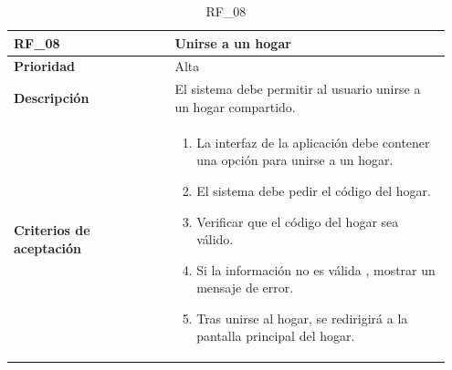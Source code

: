 \begin{table}[htb!]
    \begin{tabular}{|p{0.35\linewidth}|p{0.6\linewidth}|}
        \hline
        \rowcolor[HTML]{C0C0C0}  
        \textbf{RF\_08} & \textbf{Unirse a un hogar} \\
        \hline
        \textbf{Prioridad} & Alta \\
        \hline
        \textbf{Descripción} & El sistema debe permitir al usuario unirse a un hogar compartido.  \\
        \hline
        \vspace{0.5mm}
        \textbf{Criterios de aceptación} & 
        \begin{minipage}[t]{0.9\linewidth}
            \begin{enumerate}
                \item La interfaz de la aplicación debe contener una opción para unirse a un hogar.
                \item El sistema debe pedir el código del hogar.
                \item Verificar que el código del hogar sea válido.
                \item Si la información no es válida , mostrar un mensaje de error.
                \item Tras unirse al hogar, se redirigirá a la pantalla principal del hogar.
            \end{enumerate}
            \vspace{2mm}
        \end{minipage} \\
        \hline
    \end{tabular}
    \caption{RF\_08}
    \label{req:RF08}

\end{table}

